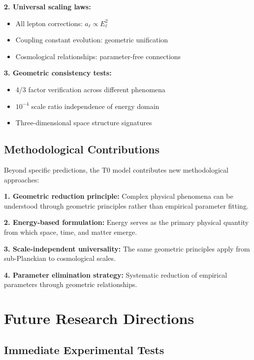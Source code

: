 \documentclass[12pt,a4paper]{report}
\begin{document}
\textbf{2. Universal scaling laws:}
\begin{itemize}
	\item All lepton corrections: $a_\ell \propto E_\ell^2$
	\item Coupling constant evolution: geometric unification
	\item Cosmological relationships: parameter-free connections
\end{itemize}

\textbf{3. Geometric consistency tests:}
\begin{itemize}
	\item 4/3 factor verification across different phenomena
	\item $10^{-4}$ scale ratio independence of energy domain
	\item Three-dimensional space structure signatures
\end{itemize}

\subsection{Methodological Contributions}
\label{subsec:methodological_contributions}

Beyond specific predictions, the T0 model contributes new methodological approaches:

\textbf{1. Geometric reduction principle:}
Complex physical phenomena can be understood through geometric principles rather than empirical parameter fitting.

\textbf{2. Energy-based formulation:}
Energy serves as the primary physical quantity from which space, time, and matter emerge.

\textbf{3. Scale-independent universality:}
The same geometric principles apply from sub-Planckian to cosmological scales.

\textbf{4. Parameter elimination strategy:}
Systematic reduction of empirical parameters through geometric relationships.

\section{Future Research Directions}
\label{sec:future_research_directions}

\subsection{Immediate Experimental Tests}
\label{subsec:immediate_tests}
\end{document}
